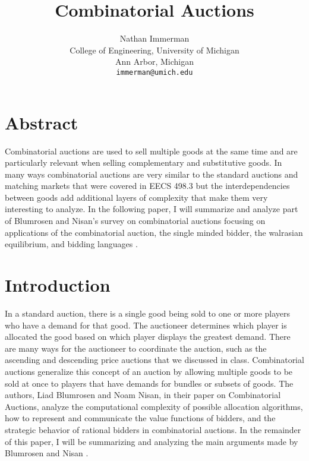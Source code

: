 \documentclass[10pt,onecolumn,letterpaper]{article}
\theoremstyle{definition}
\begin{document}
\title{Combinatorial Auctions}

\author{Nathan Immerman\\
College of Engineering, University of Michigan\\
Ann Arbor, Michigan\\
{\tt\small immerman@umich.edu}
}

\maketitle


\section{Abstract}

Combinatorial auctions are used to sell multiple goods at the same time and are particularly relevant when selling complementary and substitutive goods. In many ways combinatorial auctions are very similar to the standard auctions and matching markets that were covered in EECS 498.3 but the interdependencies between goods add additional layers of complexity that make them very interesting to analyze. In the following paper, I will summarize and analyze part of Blumrosen and Nisan's survey on combinatorial auctions focusing on applications of the combinatorial auction, the single minded bidder, the walrasian equilibrium, and bidding languages \cite{paper}.

\section{Introduction} %

In a standard auction, there is a single good being sold to one or more players who have a demand for that good. The auctioneer determines which player is allocated the good based on which player displays the greatest demand. There are many ways for the auctioneer to coordinate the auction, such as the ascending and descending price auctions that we discussed in class. Combinatorial auctions generalize this concept of an auction by allowing multiple goods to be sold at once to players that have demands for bundles or subsets of goods. The authors, Liad Blumrosen and Noam Nisan, in their paper on Combinatorial Auctions, analyze the computational complexity of possible allocation algorithms, how to represent and communicate the value functions of bidders, and the strategic behavior of rational bidders in combinatorial auctions. In the remainder of this paper, I will be summarizing and analyzing the main arguments made by Blumrosen and Nisan \cite{paper}.
\end{document}
